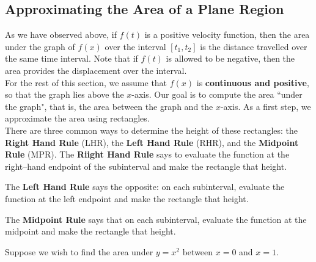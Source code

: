 \subsection{Approximating the Area of a Plane Region}
As we have observed above, if $ f(t) $ is a positive velocity function, then the area under the graph of $ f(x) $ over the interval $ [t_1,t_2] $ is the distance travelled over the same time interval.  Note that if $ f(t) $ is allowed to be negative, then the area provides the displacement over the interval.\\  









For the rest of this section, we assume that $f(x)$ is {\bf{continuous and positive}}, so that the graph lies above the $x$-axis. Our goal is to compute the area ``under the graph", that is, the area between the graph and the $x$-axis.  As a first step, we approximate the area using rectangles.\\

There are three common ways to determine the height of these rectangles: the \textbf{Right Hand Rule} (LHR), the \textbf{Left Hand Rule} (RHR), and the \textbf{Midpoint Rule} (MPR). The \textbf{Riight Hand Rule} says to evaluate the function at the right--hand endpoint of the subinterval and make the rectangle that height. 

The \textbf{Left Hand Rule} says the opposite: on each subinterval, evaluate the function at the left endpoint and make the rectangle that height. 

The \textbf{Midpoint Rule} says that on each subinterval, evaluate the function at the midpoint and make the rectangle that height. 


Suppose we wish to find the area under $y = x^2$ between $x = 0$ and $x = 1$. 





